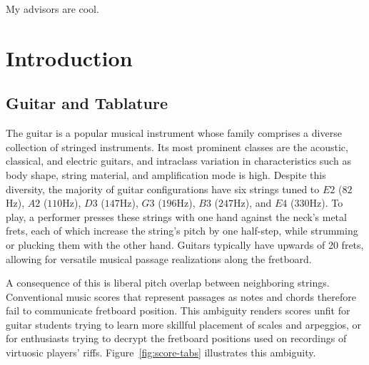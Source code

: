 \documentclass[12pt]{cmuthesis}
\begin{document}
\begin{acknowledgments}
My advisors are cool.
\end{acknowledgments}



\tableofcontents
\listoffigures
\listoftables

\mainmatter


%
%
%
%
%
\doublespacing
\noindent
\chapter{Introduction} 
\section{Guitar and Tablature} The guitar is a popular musical instrument whose family comprises a diverse collection of stringed instruments. Its most prominent classes are the acoustic, classical, and electric guitars, and intraclass variation in characteristics such as body shape, string material, and amplification mode is high. Despite this diversity, the majority of guitar configurations have six strings tuned to $E2$ ($82$Hz), $A2$ ($110$Hz), $D3$ ($147$Hz), $G3$ ($196$Hz), $B3$ ($247$Hz), and $E4$ ($330$Hz). To play, a performer presses these strings with one hand against the neck's metal frets, each of which increase the string's pitch by one half-step, while strumming or plucking them with the other hand. Guitars typically have upwards of 20 frets, allowing for versatile musical passage realizations along the fretboard.

A consequence of this is liberal pitch overlap between neighboring strings. Conventional music scores that represent passages as notes and chords therefore fail to communicate fretboard position. This ambiguity renders scores unfit for guitar students trying to learn more skillful placement of scales and arpeggios, or for enthusiasts trying to decrypt the fretboard positions used on recordings of virtuosic players' riffs. Figure~\ref{fig:score-tabs} illustrates this ambiguity.
\end{document}
